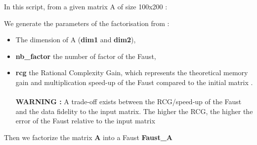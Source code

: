 In this script, from a given matrix A of size 100x200 :

We generate the parameters of the factorisation from :
\begin{itemize}
\item The dimension of A (\textbf{dim1} and \textbf{dim2}),
\item \textbf{nb\_factor} the number of factor of the Faust,
\item \textbf{rcg} the Rational Complexity Gain, which represents the theoretical memory gain and multiplication speed-up of the Faust compared to the initial matrix .
\\ \\\textbf{WARNING :}  A trade-off exists between the RCG/speed-up of the Faust and the data fidelity to the input matrix.
The higher the RCG, the higher the error of the Faust relative to the input matrix
\end{itemize}

\lstset{style=customBash}

Then we factorize the matrix \textbf{A} into a Faust \textbf{Faust\_A}



